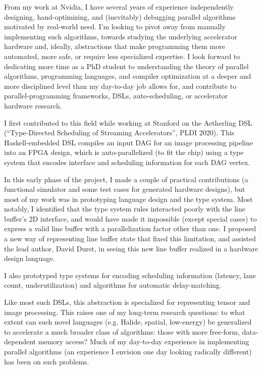


\raggedright
\reversemarginpar

From my work at Nvidia, I have several years of experience independently designing, hand-optimizing, and (inevitably) debugging parallel algorithms motivated by real-world need. I'm looking to pivot away from manually implementing such algorithms, towards studying the underlying accelerator hardware and, ideally, abstractions that make programming them more automated, more safe, or require less specialized expertise. I look forward to dedicating more time as a PhD student to understanding the theory of parallel algorithms, programming languages, and compiler optimization at a deeper and more disciplined level than my day-to-day job allows for, and contribute to parallel-programming frameworks, DSLs, auto-scheduling, or accelerator hardware research.

I first contributed to this field while working at Stanford on the Aetherling DSL (``Type-Directed Scheduling of Streaming Accelerators'', PLDI 2020). This Haskell-embedded DSL compiles an input DAG for an image processing pipeline into an FPGA design, which
is auto-parallelized (to fit the chip) using a type system that encodes interface and scheduling information for each DAG vertex.

In this early phase of the project, I made a couple of practical contributions (a functional simulator and some test cases for generated hardware designs), but most of my work was in prototyping language design and the type system.  Most notably, I identified that the type system rules interacted poorly with the line buffer's 2D
interface, and would have made it impossible (except special cases) to express a valid line buffer with a parallelization factor other than one. I proposed a new way of representing line buffer state that fixed this limitation, and assisted the lead author, David Durst, in seeing this new line buffer realized in a hardware design language.

I also prototyped type systems for encoding scheduling information (latency, lane count, underutilization) and algorithms for automatic delay-matching.

Like most such DSLs, this abstraction is specialized for representing tensor and image processing. This raises one of my long-term research questions: to what extent can such novel languages (e.g. Halide, spatial, low-energy) be generalized to accelerate a much broader class of algorithms: those with more free-form, data-dependent memory access? Much of my day-to-day experience in implementing parallel algorithms (an experience I envision one day looking radically different) has been on such problems.

